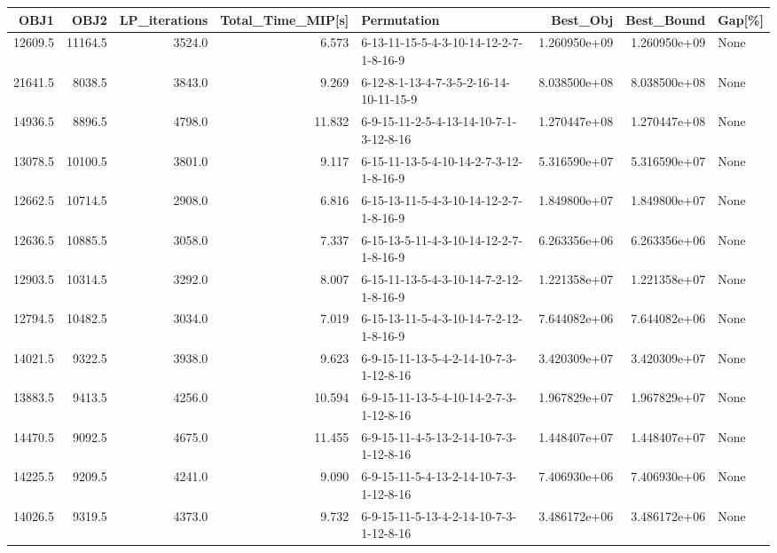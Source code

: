 \begin{tabular}{rrrrlrrl}
\toprule
    OBJ1 &     OBJ2 &  LP\_iterations &  Total\_Time\_MIP[s] &                             Permutation &      Best\_Obj &    Best\_Bound & Gap[\%] \\
\midrule
 12609.5 &  11164.5 &         3524.0 &              6.573 &  6-13-11-15-5-4-3-10-14-12-2-7-1-8-16-9 &  1.260950e+09 &  1.260950e+09 &   None \\
 21641.5 &   8038.5 &         3843.0 &              9.269 &  6-12-8-1-13-4-7-3-5-2-16-14-10-11-15-9 &  8.038500e+08 &  8.038500e+08 &   None \\
 14936.5 &   8896.5 &         4798.0 &             11.832 &  6-9-15-11-2-5-4-13-14-10-7-1-3-12-8-16 &  1.270447e+08 &  1.270447e+08 &   None \\
 13078.5 &  10100.5 &         3801.0 &              9.117 &  6-15-11-13-5-4-10-14-2-7-3-12-1-8-16-9 &  5.316590e+07 &  5.316590e+07 &   None \\
 12662.5 &  10714.5 &         2908.0 &              6.816 &  6-15-13-11-5-4-3-10-14-12-2-7-1-8-16-9 &  1.849800e+07 &  1.849800e+07 &   None \\
 12636.5 &  10885.5 &         3058.0 &              7.337 &  6-15-13-5-11-4-3-10-14-12-2-7-1-8-16-9 &  6.263356e+06 &  6.263356e+06 &   None \\
 12903.5 &  10314.5 &         3292.0 &              8.007 &  6-15-11-13-5-4-3-10-14-7-2-12-1-8-16-9 &  1.221358e+07 &  1.221358e+07 &   None \\
 12794.5 &  10482.5 &         3034.0 &              7.019 &  6-15-13-11-5-4-3-10-14-7-2-12-1-8-16-9 &  7.644082e+06 &  7.644082e+06 &   None \\
 14021.5 &   9322.5 &         3938.0 &              9.623 &  6-9-15-11-13-5-4-2-14-10-7-3-1-12-8-16 &  3.420309e+07 &  3.420309e+07 &   None \\
 13883.5 &   9413.5 &         4256.0 &             10.594 &  6-9-15-11-13-5-4-10-14-2-7-3-1-12-8-16 &  1.967829e+07 &  1.967829e+07 &   None \\
 14470.5 &   9092.5 &         4675.0 &             11.455 &  6-9-15-11-4-5-13-2-14-10-7-3-1-12-8-16 &  1.448407e+07 &  1.448407e+07 &   None \\
 14225.5 &   9209.5 &         4241.0 &              9.090 &  6-9-15-11-5-4-13-2-14-10-7-3-1-12-8-16 &  7.406930e+06 &  7.406930e+06 &   None \\
 14026.5 &   9319.5 &         4373.0 &              9.732 &  6-9-15-11-5-13-4-2-14-10-7-3-1-12-8-16 &  3.486172e+06 &  3.486172e+06 &   None \\

\end{tabular}
